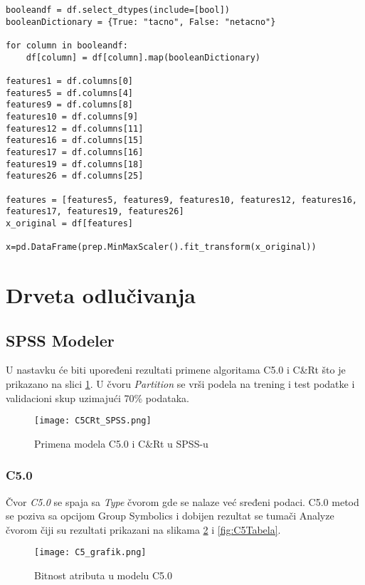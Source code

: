 \documentclass[a4paper]{article}
\begin{document}
\begin{lstlisting}[caption={Obrada podataka u Python-u},frame=single, label=ObradaPy]
booleandf = df.select_dtypes(include=[bool])
booleanDictionary = {True: "tacno", False: "netacno"}

for column in booleandf:
    df[column] = df[column].map(booleanDictionary)

features1 = df.columns[0]
features5 = df.columns[4]
features9 = df.columns[8]
features10 = df.columns[9]
features12 = df.columns[11]
features16 = df.columns[15]
features17 = df.columns[16]
features19 = df.columns[18]
features26 = df.columns[25]

features = [features5, features9, features10, features12, features16, features17, features19, features26]
x_original = df[features]

x=pd.DataFrame(prep.MinMaxScaler().fit_transform(x_original))
\end{lstlisting} 

\section{Drveta odlučivanja}
\label{sec:drveta}

\subsection{SPSS Modeler}

U nastavku će biti upoređeni rezultati primene algoritama C5.0 i C\&Rt što je prikazano na slici \ref{fig:C5CRt_SPSS}. U čvoru \textit{Partition} se vrši podela na trening i test podatke i validacioni skup uzimajući 70\% podataka.

\begin{figure}[ht]
	\centering
    \texttt{[image: C5CRt\_SPSS.png]}
    \caption{Primena modela C5.0 i C\&Rt u SPSS-u}
    \label{fig:C5CRt_SPSS}
\end{figure}


\subsubsection{C5.0}
\label{subsubsec:c50}

Čvor \textit{C5.0} se spaja sa \textit{Type} čvorom gde se nalaze već sređeni podaci. C5.0 metod se poziva sa opcijom Group Symbolics i dobijen rezultat se tumači Analyze čvorom čiji su rezultati prikazani na slikama \ref{fig:C5_grafik} i \ref{fig:C5Tabela}.

\begin{figure}[ht]
	\centering
    \texttt{[image: C5\_grafik.png]}
    \caption{Bitnost atributa u modelu C5.0}
    \label{fig:C5_grafik}
\end{figure}
            
\end{document}
